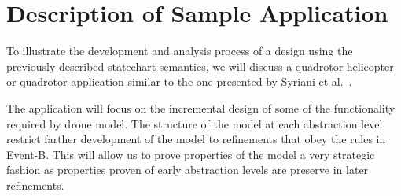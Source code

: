 

\section{Description of Sample Application}

To illustrate the development and analysis process of a design using the previously described 
statechart semantics, we will discuss a quadrotor helicopter or quadrotor application similar to 
the one presented by Syriani et al.~\cite{Syriani_2019}.

The application will focus on the incremental design of some of the functionality required by drone model.
The structure of the model at each abstraction level restrict farther development of the model to 
refinements that obey the rules in Event-B. This will allow us to prove properties of the model a 
very strategic fashion as properties proven of early abstraction levels are preserve in later refinements.

